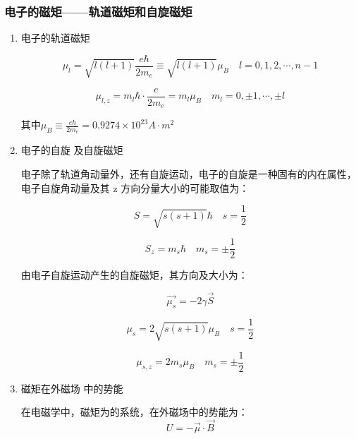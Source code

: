 \documentclass[dvipsnames, svgnames,a4paper,11pt]{article}
\begin{document}
        
    \subsubsection{电子的磁矩——轨道磁矩和自旋磁矩}

		\begin{enumerate}
			\item 电子的轨道磁矩

				\[
					\mu_l = \sqrt{l(l+1)}\frac{e \hbar}{2 m_e} \equiv \sqrt{l(l+1)}\mu_B \quad l=0,1,2,\cdots , n-1	
				\]

				\[
					\mu_{l,z} = m_l \hbar \cdot \frac{e}{2 m_e} = m_l \mu_B \quad m_l = 0,\pm 1,\cdots ,\pm l	
				\]

				其中$\mu_B \equiv \frac{e \hbar}{2 m_e} =0.9274 \times 10^{23} A\cdot m^2$



			\item 电子的自旋 及自旋磁矩
			
				电子除了轨道角动量外，还有自旋运动，电子的自旋是一种固有的内在属性，电子自旋角动量及其 z 方向分量大小的可能取值为：

				\[
					S = \sqrt{s(s+1)}\hbar \quad s = \frac{1}{2}	
				\]

				\[
					S_z = m_s \hbar \quad m_s = \pm \frac{1}{2}	
				\]



				由电子自旋运动产生的自旋磁矩，其方向及大小为：

				\[
					\vec{\mu_s} = -2 \gamma \vec{S}
				\]

				\[
					\mu_s = 2\sqrt{s(s+1)}\mu_B \quad s = \frac{1}{2}
				\]

				\[
					\mu_{s,z} = 2 m_s \mu_B \quad m_s = \pm \frac{1}{2}
				\]



			\item 磁矩在外磁场 中的势能
					
				在电磁学中，磁矩为的系统，在外磁场中的势能为：
				\[
					U = - \vec{\mu} \cdot \vec{B}
				\]	
				

					
		\end{enumerate}
\end{document}
